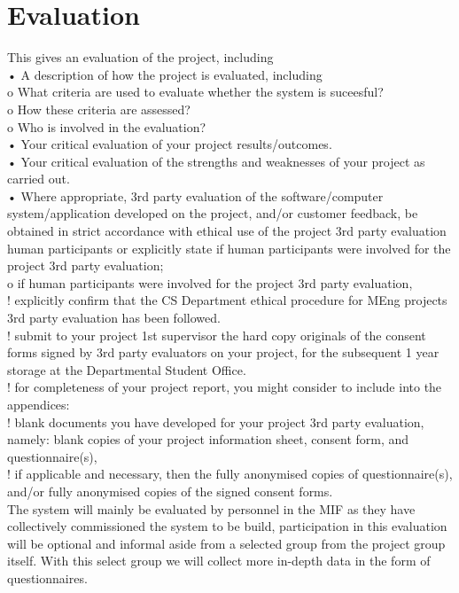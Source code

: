 \chapter{Evaluation}
\label{ch:evaluation}

This gives an evaluation of the project, including \\
• A description of how the project is evaluated, including \\
o What criteria are used to evaluate whether the system is suceesful? \\
o How these criteria are assessed? \\
o Who is involved in the evaluation? \\
• Your critical evaluation of your project results/outcomes. \\
• Your critical evaluation of the strengths and weaknesses of your project as carried out. \\
• Where appropriate, 3rd party evaluation of the software/computer
system/application developed on the project, and/or customer feedback, be
obtained in strict accordance with ethical use of the project 3rd party evaluation human participants or explicitly state if human participants were involved for the project 3rd party evaluation; \\
o if human participants were involved for the project 3rd party evaluation, \\
! explicitly confirm that the CS Department ethical procedure for MEng
projects 3rd party evaluation has been followed. \\
! submit to your project 1st supervisor the hard copy originals of the
consent forms signed by 3rd party evaluators on your project, for the
subsequent 1 year storage at the Departmental Student Office. \\
! for completeness of your project report, you might consider to include
into the appendices: \\
! blank documents you have developed for your project 3rd
party evaluation, namely: blank copies of your project
information sheet, consent form, and questionnaire(s), \\
! if applicable and necessary, then the fully anonymised copies
of questionnaire(s), and/or fully anonymised copies of the
signed consent forms. \\

The system will mainly be evaluated by personnel in the MIF as they have collectively commissioned the system to be build, participation in this evaluation will be optional and informal aside from a selected group from the project group itself. With this select group we will collect more in-depth data in the form of questionnaires. \\

